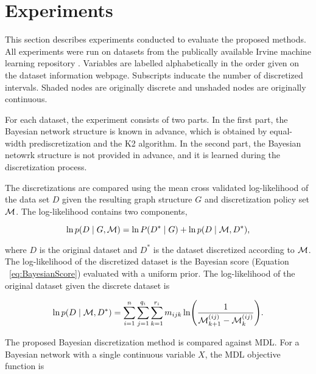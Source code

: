
\section{Experiments}
\label{sec:experiments}

This section describes experiments conducted to evaluate the proposed methods.
All experiments were run on datasets from the publically available Irvine machine learning repository \citep{Lichman_2013}.
Variables are labelled alphabetically in the order given on the dataset information webpage.
Subscripts inducate the number of discretized intervals.
Shaded nodes are originally discrete and unshaded nodes are originally continuous.

For each dataset, the experiment consists of two parts.
In the first part, the Bayesian network structure is known in advance, which is obtained by equal-width prediscretization and the K2 algorithm.
In the second part, the Bayesian netowrk structure is not provided in advance, and it is learned during the discretization process.

The discretizations are compared using the mean cross validated log-likelihood of the data set $D$ given the resulting graph structure $G$ and discretization policy set $\mathcal{M}$.
The log-likelihood contains two components,

\begin{equation}
\ln p(D\mid G, \mathcal{M}) = \ln P(D^*\mid G) + \ln p(D\mid \mathcal{M}, D^*)\text{,}
\end{equation}

\noindent
where $D$ is the original dataset and $D^*$ is the dataset discretized according to $\mathcal{M}$.
The log-likelihood of the discretized dataset is the Bayesian score (Equation ~\ref{eq:BayesianScore}) evaluated with a uniform prior.
The log-likelihood of the original dataset given the discrete dataset is

\begin{equation}
  \ln p(D\mid \discset, D^*) = \sum_{i=1}^n \sum_{j=1}^{q_i} \sum_{k=1}^{r_i} m_{ijk} \ln\paren{
    \frac{
      1
    }{
      \discset^{(ij)}_{k+1} - \discset^{(ij)}_{k}
    }
  }\text{.}
\end{equation}

The proposed Bayesian discretization method is compared against MDL.
For a Bayesian network with a single continuous variable $X$, the MDL objective function is

